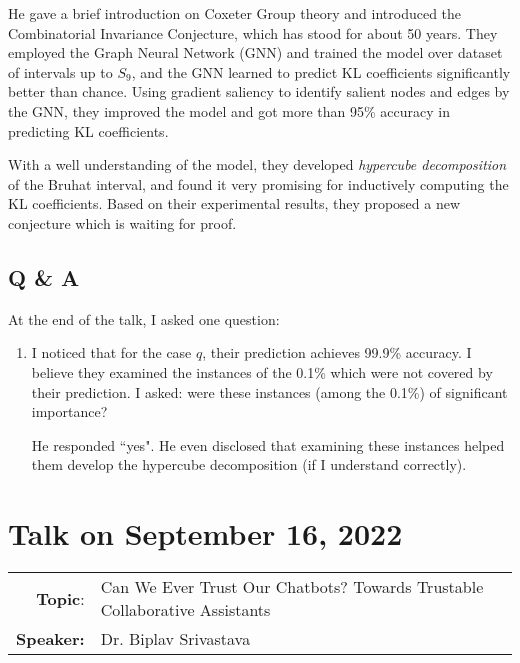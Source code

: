 \documentclass[11pt, oneside]{article}   	%
\begin{document}
He gave a brief introduction on Coxeter Group theory and introduced
the Combinatorial Invariance Conjecture, which has stood for about 50
years. They employed the Graph Neural Network (GNN) and trained the
model over dataset of intervals up to $S_9$, and the GNN learned to
predict KL coefficients significantly better than chance. Using
gradient saliency to identify salient nodes and edges by the GNN, they
improved the model and got more than 95\% accuracy in predicting KL
coefficients.


With a well understanding of the model, they developed \emph{hypercube
decomposition} of the Bruhat interval, and found it very promising for
inductively computing the KL coefficients. Based on their experimental
results, they proposed a new conjecture which is waiting for proof.


\subsection{Q \& A}



At the end of the talk, I asked one question:
\begin{enumerate}
\item I noticed that for the case $q$, their prediction achieves
  99.9\% accuracy. I believe they examined the instances of the 0.1\%
  which were not covered by their prediction. I asked: were these
  instances (among the 0.1\%) of significant importance?
  

He responded ``yes". He even disclosed that examining these instances
helped them develop the hypercube decomposition (if I understand
correctly).


\end{enumerate}

\newpage
\section{Talk on September 16, 2022}
\begin{tabularx} {\textwidth}{r X}
\textbf{Topic}: & Can We Ever Trust Our Chatbots? Towards Trustable Collaborative Assistants\\
\textbf{Speaker:} & Dr. Biplav Srivastava\\
\end{tabularx}
\end{document}
